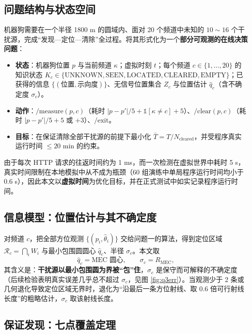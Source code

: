 \documentclass{cumcmthesis}
\begin{document}
\subsection{问题结构与状态空间}

机器狗需要在一个半径 1800 m 的圆域内、面对 20 个频道中未知的 $10\sim16$ 个干扰源，完成“发现—定位—清除”全过程。将其形式化为一个\textbf{部分可观测的在线决策问题}：

\begin{itemize}
  \item \textbf{状态}：机器狗位置 $p$ 与当前频道 $\kappa$；虚拟时刻 $t$；每个频道 $c\in\{1,\dots,20\}$ 的知识状态 $K_c\in\{\text{UNKNOWN},\text{SEEN},\text{LOCATED},\text{CLEARED},\text{EMPTY}\}$；已获得的信息 $\{(\text{位置},\text{示向度})\}$、无信号位置集合 $Z_c$ 与位置估计 $\hat q_c$（含不确定度 $\sigma_c$）。
  \item \textbf{动作}：$\text{/measure}(p,c)$（耗时 $|p-p'|/5+\mathbb 1[\kappa\ne c]+5$）、$\text{/clear}(p,c)$（耗时 $|p-p'|/5+5$ 或 $+3$）、$\text{/exit}$。
  \item \textbf{目标}：在保证清除全部干扰源的前提下最小化 $\bar T=T/N_{\text{cleared}}$，并受程序真实运行时间 $\le20$ min 的约束。
\end{itemize}

由于每次 HTTP 请求的往返时间约为 1 ms，而一次检测在虚拟世界中耗时 5 s，真实时间限制在本地模拟中从不成为瓶颈（60 组演练中单局程序运行时间均小于 0.6 s），因此本文以\textbf{虚拟时间}为优化目标，并在正式测试中如实记录程序运行时间。

\subsection{信息模型：位置估计与其不确定度}

对频道 $c$，把全部方位观测 $\{(p_i,\hat\theta_i)\}$ 交给问题一的算法，得到定位区域 $\mathcal R_c=\bigcap_i W_i$ 与最小包围圆圆心 $\hat q_c$、半径 $\sigma_c$。本文取
\begin{equation}
\hat q_c=\text{MEC 圆心},\qquad \sigma_c=R_{\mathrm{MEC}},
\end{equation}
其含义是：\textbf{干扰源以最小包围圆为界被“包”住}，$\sigma_c$ 是保守而可解释的不确定度（后续检验表明真实误差几乎总不超过 $\sigma_c$，见图 \ref{fig:q3err}）。当观测少于 2 条或几何退化导致定位区域无界时，退化为“沿最后一条方位射线、取 $0.6$ 倍可行射线长度”的粗略估计，$\sigma_c$ 取该射线长度。

\subsection{保证发现：七点覆盖定理}
\end{document}
